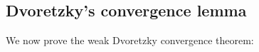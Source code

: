 \documentclass{article}
\def\E{\mathbb{E}}
\begin{document}
        
\subsection{Dvoretzky's convergence lemma}

We now prove the weak Dvoretzky convergence theorem:
\end{document}
